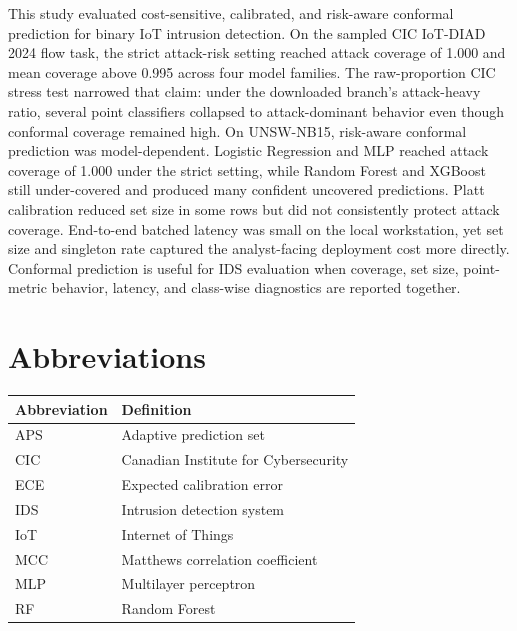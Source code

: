 \documentclass[11pt]{article}
\begin{document}
This study evaluated cost-sensitive, calibrated, and risk-aware conformal prediction for binary IoT intrusion detection. On the sampled CIC IoT-DIAD 2024 flow task, the strict attack-risk setting reached attack coverage of 1.000 and mean coverage above 0.995 across four model families. The raw-proportion CIC stress test narrowed that claim: under the downloaded branch's attack-heavy ratio, several point classifiers collapsed to attack-dominant behavior even though conformal coverage remained high. On UNSW-NB15, risk-aware conformal prediction was model-dependent. Logistic Regression and MLP reached attack coverage of 1.000 under the strict setting, while Random Forest and XGBoost still under-covered and produced many confident uncovered predictions. Platt calibration reduced set size in some rows but did not consistently protect attack coverage. End-to-end batched latency was small on the local workstation, yet set size and singleton rate captured the analyst-facing deployment cost more directly. Conformal prediction is useful for IDS evaluation when coverage, set size, point-metric behavior, latency, and class-wise diagnostics are reported together.

\section*{Abbreviations}

\begin{tabular}{@{}ll@{}}
\toprule
Abbreviation & Definition \\
\midrule
APS & Adaptive prediction set \\
CIC & Canadian Institute for Cybersecurity \\
ECE & Expected calibration error \\
IDS & Intrusion detection system \\
IoT & Internet of Things \\
MCC & Matthews correlation coefficient \\
MLP & Multilayer perceptron \\
RF & Random Forest \\
\bottomrule
\end{tabular}



\end{document}
